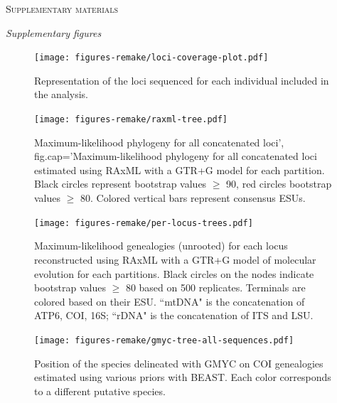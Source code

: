 \documentclass[12pt,letterpaper]{article}\usepackage[]{graphicx}\usepackage[]{color}
\renewcommand{\section}[1]{%
\bigskip
\begin{center}
\begin{Large}
\normalfont\scshape #1
\medskip
\end{Large}
\end{center}}
\renewcommand{\subsection}[1]{%
\bigskip
\begin{center}
\begin{large}
\normalfont\itshape #1
\end{large}
\end{center}}
\begin{document}

\pagebreak





\pagebreak

\section{Supplementary materials}

\subsection{Supplementary figures}

\begin{figure}
{\centering \texttt{[image: figures-remake/loci-coverage-plot.pdf]}}

\caption{Representation of the loci sequenced for each individual included in
  the analysis.}\label{fig:loci-coverage-plot}
\end{figure}



\begin{figure}
  {\centering \texttt{[image: figures-remake/raxml-tree.pdf]}}
  \caption{Maximum-likelihood phylogeny for all concatenated loci',
    fig.cap='Maximum-likelihood phylogeny for all concatenated loci estimated
    using RAxML with a GTR+G model for each partition. Black circles represent
    bootstrap values $\geq$ 90, red circles bootstrap values $\geq$
    80. Colored vertical bars represent consensus
    ESUs.}\label{fig:raxml-tree}
\end{figure}

\begin{figure}
  {\centering \texttt{[image: figures-remake/per-locus-trees.pdf]}}
  \caption{Maximum-likelihood genealogies (unrooted) for each locus
    reconstructed using RAxML with a GTR+G model of molecular evolution for each
    partitions. Black circles on the nodes indicate bootstrap values $\geq$ 80
    based on 500 replicates. Terminals are colored based on their ESU. ``mtDNA"
    is the concatenation of ATP6, COI, 16S; ``rDNA" is the concatenation of ITS
    and LSU.}\label{fig:per-locus-trees}
\end{figure}


\begin{figure}
  {\centering \texttt{[image: figures-remake/gmyc-tree-all-sequences.pdf]}}
  \caption{Position of the species delineated with GMYC on COI genealogies
    estimated using various priors with BEAST. Each color corresponds to a
    different putative species.}\label{fig:gmyc-tree-plot-allSeq}
\end{figure}
\end{document}
